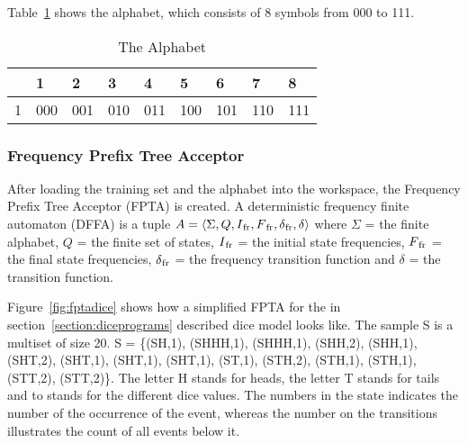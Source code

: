 \documentclass[
a4paper,
12pt
]{scrartcl}
\newcommand{\gray}{\cellcolor{grayself}}  %
\begin{document}
Table~\ref{table:alphabet} shows the alphabet, which consists of 8 symbols from 000 to 111.

\begin{table}[ht!]
\centering
\begin{tabular}{|l|l|l|l|l|l|l|l|l|}
\hline
\gray & \gray 1 & \gray 2 & \gray 3 & \gray 4 & \gray 5 & \gray 6 & \gray 7 & \gray 8 \\ \hline
\gray 1 & 000 & 001 & 010 & 011 & 100 & 101 & 110 & 111 \\ \hline
\end{tabular}
\caption{The Alphabet}
\label{table:alphabet}
\end{table}

\subsubsection{Frequency Prefix Tree Acceptor}
After loading the training set and the alphabet into the workspace, the Frequency Prefix Tree Acceptor (FPTA) is created. A deterministic frequency finite automaton (DFFA) is a tuple $A = \langle \Sigma, Q, I\textsubscript{fr}, F\textsubscript{fr}, \delta\textsubscript{fr}, \delta \rangle$ where $ \Sigma $ = the finite alphabet, $Q$ = the finite set of states, $I\textsubscript{fr}$ = the initial state frequencies, $F\textsubscript{fr}$ = the final state frequencies, $\delta\textsubscript{fr}$ = the frequency transition function and $ \delta$ = the transition function.

Figure~\ref{fig:fptadice} shows how a simplified FPTA for the in section~\ref{section:diceprograms} described dice model looks like. The sample S is a multiset of size 20. S = \{(SH,1), (SHHH,1), (SHHH,1), (SHH,2), (SHH,1), (SHT,2), (SHT,1), (SHT,1), (SHT,1), (ST,1), (STH,2), (STH,1), (STH,1), (STT,2), (STT,2)\}. The letter H stands for heads, the letter T stands for tails and  to  stands for the different dice values. The numbers in the state indicates the number of the occurrence of the event, whereas the number on the transitions illustrates the count of all events below it.
\end{document}
